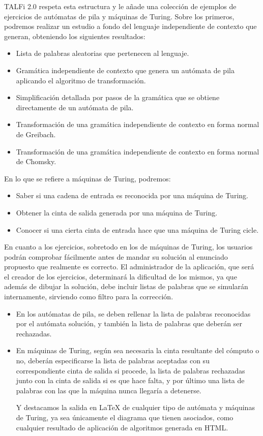 \documentclass[12pt,a4paper,spanish]{book}
\begin{document}
TALFi 2.0 respeta esta estructura y le a\~nade una colecci\'on de ejemplos de ejercicios de aut\'omatas de pila y m\'aquinas de Turing. Sobre los primeros, podremos realizar un estudio a fondo del lenguaje independiente de contexto que generan, obteniendo los siguientes resultados:
\begin{itemize}
\item Lista de palabras aleatorias que pertenecen al lenguaje.
\item Gram\'atica independiente de contexto que genera un aut\'omata de pila aplicando el algoritmo de transformaci\'on.
\item Simplificaci\'on detallada por pasos de la gram\'atica que se obtiene directamente de un aut\'omata de pila.
\item Transformaci\'on de una gram\'atica independiente de contexto en forma normal de Greibach.
\item Transformaci\'on de una gram\'atica independiente de contexto en forma normal de Chomsky.\\
\end{itemize}

En lo que se refiere a m\'aquinas de Turing, podremos:
\begin{itemize}
\item Saber si una cadena de entrada es reconocida por una m\'aquina de Turing.
\item Obtener la cinta de salida generada por una m\'aquina de Turing.
\item Conocer si una cierta cinta de entrada hace que una m\'aquina de Turing cicle.
\end{itemize}

En cuanto a los ejercicios, sobretodo en los de m\'aquinas de Turing, los usuarios podr\'an comprobar f\'acilmente antes de mandar su soluci\'on al enunciado propuesto que realmente es correcto.
El administrador de la aplicaci\'on, que ser\'a el creador de los ejercicios, determinar\'a la dificultad de los mismos, ya que adem\'as de dibujar la soluci\'on, debe incluir listas de palabras que se simular\'an internamente, sirviendo como filtro para la correcci\'on.
\begin{itemize}
\item En los aut\'omatas de pila, se deben rellenar la lista de palabras reconocidas por el aut\'omata soluci\'on, y tambi\'en la lista de palabras que deber\'an ser rechazadas.
\item En m\'aquinas de Turing, seg\'un sea necesaria la cinta resultante del c\'omputo o no, deber\'an especificarse la lista de palabras aceptadas con su correspondiente cinta de salida si procede, la lista de palabras rechazadas junto con la cinta de salida si es que hace falta, y por \'ultimo una lista de palabras con las que la m\'aquina nunca llegar\'ia a detenerse.

Y destacamos la salida en \LaTeX{} de cualquier tipo de aut\'omata y m\'aquinas de Turing, ya sea \'unicamente el diagrama que tienen asociados, como cualquier resultado de aplicaci\'on de algoritmos generada en HTML. 
\end{itemize}
\end{document}
